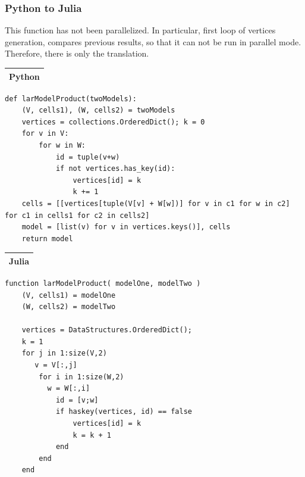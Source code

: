 \documentclass{article}
\begin{document}
\subsubsection{Python to Julia}
This function has not been parallelized. In particular, first loop of vertices generation, compares previous results, so that it can not be run in parallel mode. Therefore, there is only the translation.
\vspace{1ex}
\begin{flushleft} \small
\begin{center}
\begin{tabular}{|p{16cm}|}
\hline
\cellcolor[gray]{.9}Python\\
\hline
\end{tabular}
\end{center}
\vspace{2ex}
\begin{list}{}{} \item
\begin{Verbatim}[tabsize=4]
def larModelProduct(twoModels):
    (V, cells1), (W, cells2) = twoModels
    vertices = collections.OrderedDict(); k = 0
    for v in V:
        for w in W:
            id = tuple(v+w)
            if not vertices.has_key(id):
                vertices[id] = k
                k += 1   
    cells = [[vertices[tuple(V[v] + W[w])] for v in c1 for w in c2] for c1 in cells1 for c2 in cells2] 
    model = [list(v) for v in vertices.keys()], cells
    return model
\end{Verbatim}
\end{list}
\vspace{2ex}
\begin{center}
\begin{tabular}{|p{16cm}|}
\hline
\cellcolor[gray]{.9}Julia\\
\hline
\end{tabular}
\end{center}
\vspace{2ex}
\begin{list}{}{} \item
\begin{Verbatim}[tabsize=4]
function larModelProduct( modelOne, modelTwo )
    (V, cells1) = modelOne
    (W, cells2) = modelTwo

    vertices = DataStructures.OrderedDict(); 
    k = 1
    for j in 1:size(V,2)
       v = V[:,j]
        for i in 1:size(W,2)
          w = W[:,i]
            id = [v;w]
            if haskey(vertices, id) == false
                vertices[id] = k
                k = k + 1
            end
        end
    end
    

\end{Verbatim}
\end{list}
\end{flushleft}
\end{document}
